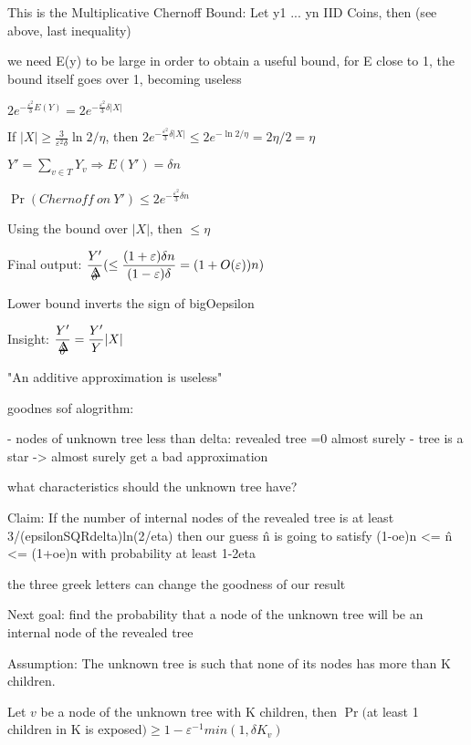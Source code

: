 \documentclass{report}
\begin{document}
	This is the Multiplicative Chernoff Bound: Let y1 ... yn IID Coins, then (see above, last inequality)
	
	we need E(y) to be large in order to obtain a useful bound, for E close to 1, the bound itself goes over 1, becoming useless
	
	$\displaystyle 2e^{-\frac{\varepsilon^2}{3}E(Y)} = 2e^{-\frac{\varepsilon^2}{3}\delta|X|}$
	
	If $\displaystyle |X| \geq \frac{3}{\varepsilon^2\delta}\ln2/\eta$, then $\displaystyle 2e^{-\frac{\varepsilon^2}{3}\delta|X|} \leq 2e^{-\ln2/\eta} = 2\eta/2 = \eta$
	
	$Y' = \sum_{v \in T}Y_v \Rightarrow E(Y') = \delta n$
	
	$\Pr(Chernoff\ on\ Y') \leq 2e^{-\frac{\varepsilon^2}{3}\delta n}$
	
	Using the bound over $|X|$, then $\leq \eta$
	
	Final output: $\displaystyle \frac{Y'}{\mathaccent 1 \delta } (\leq  \frac{(1 + \varepsilon)\delta n}{(1 - \varepsilon)\delta} = (1+O(\varepsilon))n )$
	
	Lower bound inverts the sign of bigOepsilon
	
	Insight: $\displaystyle \frac{Y'}{\mathaccent 1 \delta } = \frac{Y'}{Y}|X|$
	
	
	
	"An additive approximation is useless"
	
	
	goodnes sof alogrithm:
	
	 - nodes of unknown tree less than delta: revealed tree =0 almost surely
	 - tree is a star -> almost surely get a bad approximation
	 
	what characteristics should the unknown tree have?
	
	Claim: If the number of internal nodes of the revealed tree is at least 3/(epsilonSQRdelta)ln(2/eta) then our guess \^n is going to satisfy (1-oe)n <= \^n <= (1+oe)n with probability at least 1-2eta
	
	the three greek letters can change the goodness of our result
	
	Next goal: find the probability that a node of the unknown tree will be an internal node of the revealed tree
	
	Assumption: The unknown tree is such that none of its nodes has more than K children.
	
	Let $v$ be a node of the unknown tree with K children, then $\Pr($at least 1 children in K is exposed$) \geq 1-\varepsilon^{-1}min(1, \delta K_v)$
	
\end{document}

